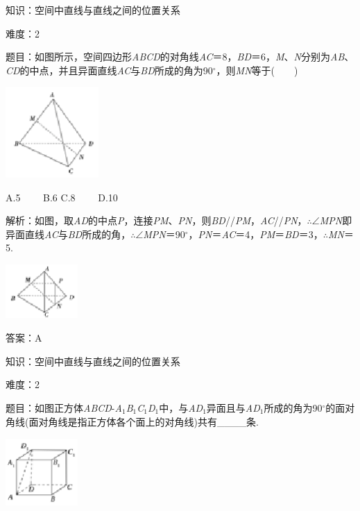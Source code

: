 \documentclass{article} %
\begin{document}
知识：空间中直线与直线之间的位置关系

难度：2

题目：如图所示，空间四边形\textit{ABCD}的对角线\textit{AC}＝8，\textit{BD}＝6，\textit{M}、\textit{N}分别为\textit{AB}、\textit{CD}的中点，并且异面直线\textit{AC}与\textit{BD}所成的角为90$\mathrm{{}^\circ}$，则\textit{MN}等于(　　)

\includegraphics*[width=1.40in, height=1.36in, keepaspectratio=false]{image111}

A.5　　 B.6 C.8　　 D.10

解析：如图，取\textit{AD}的中点\textit{P}，连接\textit{PM}、\textit{PN}，则\textit{BD}//\textit{PM}，\textit{AC}//\textit{PN}，$\mathrm{\therefore}$$\mathrm{\angle}$\textit{MPN}即异面直线\textit{AC}与\textit{BD}所成的角，$\mathrm{\therefore}$$\mathrm{\angle}$\textit{MPN}＝90$\mathrm{{}^\circ}$，\textit{PN}＝\textit{AC}＝4，\textit{PM}＝\textit{BD}＝3，$\mathrm{\therefore}$\textit{MN}＝5.

\includegraphics*[width=1.08in, height=0.81in, keepaspectratio=false]{image112}

答案：A

知识：空间中直线与直线之间的位置关系

难度：2

题目：如图正方体\textit{ABCD}-\textit{A}${}_{1}$\textit{B}${}_{1}$\textit{C}${}_{1}$\textit{D}${}_{1}$中，与\textit{AD}${}_{1}$异面且与\textit{AD}${}_{1}$所成的角为90$\mathrm{{}^\circ}$的面对角线(面对角线是指正方体各个面上的对角线)共有\_\_\_\_条.

\includegraphics*[width=1.08in, height=1.01in, keepaspectratio=false]{image113}
\end{document}
